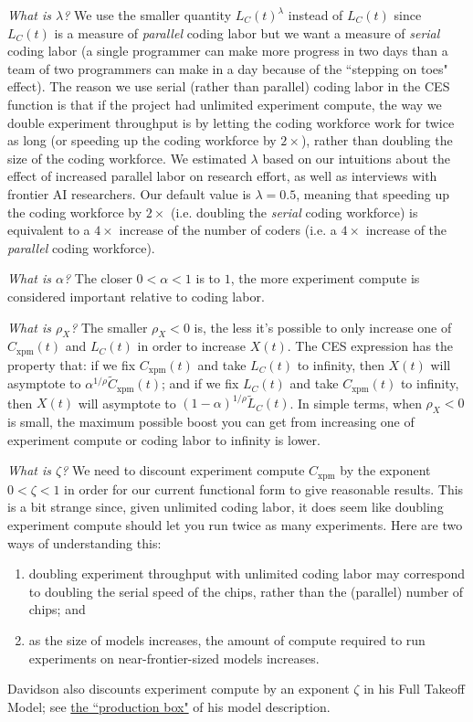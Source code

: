 \documentclass{article}
\theoremstyle{definition}
\begin{document}
\textit{What is $\lambda$?} We use the smaller quantity $L_C(t)^\lambda$ instead of $L_C(t)$ since $L_C(t)$ is a measure of \textit{parallel} coding labor but we want a measure of \textit{serial} coding labor (a single programmer can make more progress in two days than a team of two programmers can make in a day because of the ``stepping on toes" effect). The reason we use serial (rather than parallel) coding labor in the CES function is that if the project had unlimited experiment compute, the way we double experiment throughput is by letting the coding workforce work for twice as long (or speeding up the coding workforce by $2 \times$), rather than doubling the size of the coding workforce. We estimated $\lambda$ based on our intuitions about the effect of increased parallel labor on research effort, as well as interviews with frontier AI researchers. Our default value is $\lambda = 0.5$, meaning that speeding up the coding workforce by $2 \times$ (i.e. doubling the \textit{serial} coding workforce) is equivalent to a $4 \times$ increase of the number of coders (i.e. a $4\times$ increase of the \textit{parallel} coding workforce).

\textit{What is $\alpha$?} The closer $0< \alpha < 1$ is to $1$, the more experiment compute is considered important relative to coding labor. 

\textit{What is $\rho_X$?} The smaller $\rho_X < 0$ is, the less it's possible to only increase one of $C_{\text{xpm}}(t)$ and $L_C(t)$ in order to increase $X(t)$. The CES expression has the property that: if we fix $C_\text{xpm}(t)$ and take $L_C(t)$ to infinity, then $X(t)$ will asymptote to $\alpha^{1/\rho} \tilde{C}_\text{xpm}(t)$; and if we fix $L_C(t)$ and take $C_\text{xpm}(t)$ to infinity, then $X(t)$ will asymptote to $(1-\alpha)^{1/\rho} \tilde{L}_C(t)$. In simple terms, when $\rho_X < 0$ is small, the maximum possible boost you can get from increasing one of experiment compute or coding labor to infinity is lower.

\textit{What is $\zeta$?} We need to discount experiment compute $C_\text{xpm}$ by the exponent $0 < \zeta < 1$ in order for our current functional form to give reasonable results. This is a bit strange since, given unlimited coding labor, it does seem like doubling experiment compute should let you run twice as many experiments. Here are two ways of understanding this:
\begin{enumerate}
\item doubling experiment throughput with unlimited coding labor may correspond to doubling the serial speed of the chips, rather than the (parallel) number of chips; and
\item as the size of models increases, the amount of compute required to run experiments on near-frontier-sized models increases.
\end{enumerate}
Davidson also discounts experiment compute by an exponent $\zeta$ in his Full Takeoff Model; see \href{https://takeoffspeeds.com/description.html#production}{the ``production box"} of his model description.
\end{document}
